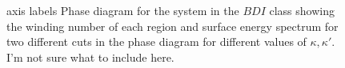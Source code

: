 \documentclass[twocolumn,amsmath,longbibliography,amssymb,superscriptaddress]{revtex4-1}
\newcommand{\carlos}[1]{{\color{red} #1}}
\newcommand{\maria}[1]{{\color{blue} #1}}
\begin{document}
\begin{figure}[h!]
\centering
{}\hspace{0mm}

\hspace{0mm}

\caption{\maria{axis labels} Phase diagram for the system in the $BDI$ class showing the winding number of each region and surface energy spectrum for two different cuts in the phase diagram for different values of $\kappa,\kappa'$. \carlos{I'm not sure what to include here.}}
\label{bdi_phase_diagram}
\end{figure}
\end{document}

